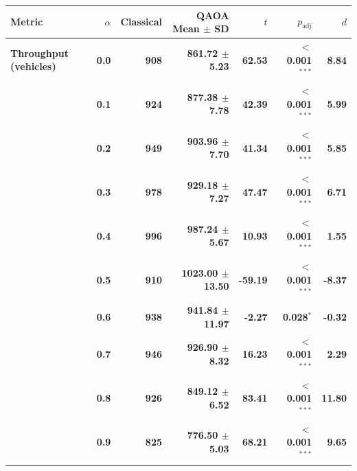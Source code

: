 \documentclass[12pt]{article}
\begin{document}
\begin{table}[H]
\centering

\begin{tabular}{lrrrrrr}
\toprule
Metric & $\alpha$ & Classical & QAOA Mean $\pm$ SD & $t$ & $p_{\text{adj}}$ & $d$ \\
\midrule
{\boldmath\bfseries Throughput (vehicles)} & {\boldmath\bfseries 0.0} & {\boldmath\bfseries 908} & {\boldmath\bfseries 861.72 $\pm$ 5.23} & {\boldmath\bfseries 62.53} & {\boldmath\bfseries $<$0.001$^{***}$} & {\boldmath\bfseries 8.84} \\
 & {\boldmath\bfseries 0.1} & {\boldmath\bfseries 924} & {\boldmath\bfseries 877.38 $\pm$ 7.78} & {\boldmath\bfseries 42.39} & {\boldmath\bfseries $<$0.001$^{***}$} & {\boldmath\bfseries 5.99} \\
 & {\boldmath\bfseries 0.2} & {\boldmath\bfseries 949} & {\boldmath\bfseries 903.96 $\pm$ 7.70} & {\boldmath\bfseries 41.34} & {\boldmath\bfseries $<$0.001$^{***}$} & {\boldmath\bfseries 5.85} \\
 & {\boldmath\bfseries 0.3} & {\boldmath\bfseries 978} & {\boldmath\bfseries 929.18 $\pm$ 7.27} & {\boldmath\bfseries 47.47} & {\boldmath\bfseries $<$0.001$^{***}$} & {\boldmath\bfseries 6.71} \\
 & {\boldmath\bfseries 0.4} & {\boldmath\bfseries 996} & {\boldmath\bfseries 987.24 $\pm$ 5.67} & {\boldmath\bfseries 10.93} & {\boldmath\bfseries $<$0.001$^{***}$} & {\boldmath\bfseries 1.55} \\
 & {\boldmath\bfseries 0.5} & {\boldmath\bfseries 910} & {\boldmath\bfseries 1023.00 $\pm$ 13.50} & {\boldmath\bfseries -59.19} & {\boldmath\bfseries $<$0.001$^{***}$} & {\boldmath\bfseries -8.37} \\
 & {\boldmath\bfseries 0.6} & {\boldmath\bfseries 938} & {\boldmath\bfseries 941.84 $\pm$ 11.97} & {\boldmath\bfseries -2.27} & {\boldmath\bfseries 0.028$^{*}$} & {\boldmath\bfseries -0.32} \\
 & {\boldmath\bfseries 0.7} & {\boldmath\bfseries 946} & {\boldmath\bfseries 926.90 $\pm$ 8.32} & {\boldmath\bfseries 16.23} & {\boldmath\bfseries $<$0.001$^{***}$} & {\boldmath\bfseries 2.29} \\
 & {\boldmath\bfseries 0.8} & {\boldmath\bfseries 926} & {\boldmath\bfseries 849.12 $\pm$ 6.52} & {\boldmath\bfseries 83.41} & {\boldmath\bfseries $<$0.001$^{***}$} & {\boldmath\bfseries 11.80} \\
 & {\boldmath\bfseries 0.9} & {\boldmath\bfseries 825} & {\boldmath\bfseries 776.50 $\pm$ 5.03} & {\boldmath\bfseries 68.21} & {\boldmath\bfseries $<$0.001$^{***}$} & {\boldmath\bfseries 9.65} \\

\end{tabular}
\end{table}
\end{document}
